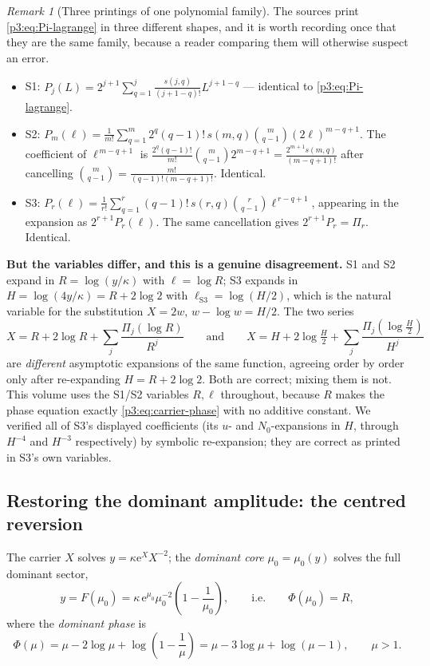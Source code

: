 \documentclass[11pt,a4paper,oneside]{book}
\theoremstyle{plain}
\theoremstyle{definition}
\theoremstyle{remark}
\newtheorem{remark}[theorem]{Remark}
\newcommand{\e}{\mathrm{e}}
\begin{document}
\begin{remark}[Three printings of one polynomial family]\label{p3:rem:H-versus-R}
The sources print \cref{p3:eq:Pi-lagrange} in three different shapes, and it is worth recording
once that they are the same family, because a reader comparing them will otherwise suspect an
error.
\begin{itemize}
\item S1: $P_{j}(L)=2^{j+1}\sum_{q=1}^{j}\frac{s(j,q)}{(j+1-q)!}L^{j+1-q}$ ---
identical to \cref{p3:eq:Pi-lagrange}.
\item S2: $P_{m}(\ell)=\frac1{m!}\sum_{q=1}^{m}2^{q}(q-1)!\,s(m,q)
\binom{m}{q-1}(2\ell)^{m-q+1}$. The coefficient of $\ell^{\,m-q+1}$ is
$\frac{2^{q}(q-1)!}{m!}\binom{m}{q-1}2^{m-q+1} =\frac{2^{m+1}s(m,q)}{(m-q+1)!}$ after cancelling
$\binom{m}{q-1}=\frac{m!}{(q-1)!(m-q+1)!}$. Identical.
\item S3: $P_{r}(\ell)=\frac1{r!}\sum_{q=1}^{r}(q-1)!\,s(r,q)\binom{r}{q-1}
\ell^{\,r-q+1}$, appearing in the expansion as $2^{r+1}P_{r}(\ell)$. The same cancellation gives
$2^{r+1}P_{r}=\Pi_{r}$. Identical.
\end{itemize}
\textbf{But the variables differ, and this is a genuine disagreement.} S1 and S2 expand in
$R=\log(y/\kappa)$ with $\ell=\log R$; S3 expands in $H=\log(4y/\kappa)=R+2\log2$ with
$\ell_{\mathrm{S3}}=\log(H/2)$, which is the natural variable for the substitution $X=2w$, $w-\log
w=H/2$. The two series
\[
X=R+2\log R+\sum_{j}\frac{\Pi_{j}(\log R)}{R^{j}} \qquad\text{and}\qquad X=H+2\log\tfrac
H2+\sum_{j}\frac{\Pi_{j}(\log\tfrac H2)}{H^{j}}
\]
are \emph{different} asymptotic expansions of the same function, agreeing order by order only
after re-expanding $H=R+2\log2$. Both are correct; mixing them is not. This volume uses the S1/S2
variables $R,\ell$ throughout, because $R$ makes the phase equation exactly
\cref{p3:eq:carrier-phase} with no additive constant. We verified all of S3's displayed
coefficients (its $u$- and $N_{0}$-expansions in $H$, through $H^{-4}$ and $H^{-3}$ respectively)
by symbolic re-expansion; they are correct as printed in S3's own variables.
\end{remark}

\subsection{Restoring the dominant amplitude: the centred reversion}
\label{p3:sub:core}

The carrier $X$ solves $y=\kappa\e^{X}X^{-2}$; the \emph{dominant core} $\mu_{0}=\mu_{0}(y)$
solves the full dominant sector,
\begin{equation}\label{p3:eq:core-equation}
 y=F(\mu_{0})=\kappa\,\e^{\mu_{0}}\mu_{0}^{-2}\left(1-\frac1{\mu_{0}}\right),
 \qquad\text{i.e.}\qquad
 \Phi(\mu_{0})=R,
\end{equation}
where the \emph{dominant phase} is
\begin{equation}\label{p3:eq:Phi}
 \Phi(\mu)=\mu-2\log\mu+\log\!\left(1-\frac1\mu\right)
          =\mu-3\log\mu+\log(\mu-1),\qquad \mu>1 .
\end{equation}
\end{document}
